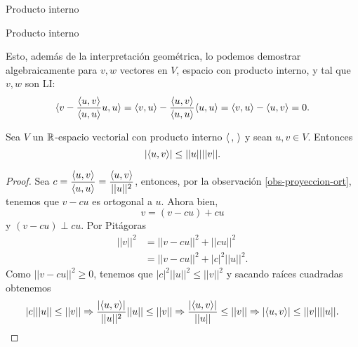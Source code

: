 \begin{chapter}{Producto interno}
\begin{section}{Producto interno}
\begin{observacion}
        
            Esto,  además de la interpretación geométrica, lo podemos demostrar algebraicamente para $v,w$ vectores en $V$, espacio con producto interno, y  tal que $v, w$ son LI:
            \begin{equation*}
            \langle v - \frac{\langle u,v\rangle}{\langle u,u\rangle} u , u \rangle =
            \langle v , u \rangle  -\frac{\langle u,v\rangle}{\langle u,u\rangle}\langle u , u \rangle =  \langle v , u \rangle -  \langle u , v \rangle =0.
            \end{equation*}
            
        \end{observacion}
        
        \begin{proposicion}\label{prop-cauchy-schwarz} Sea $V$  un $\mathbb R$-espacio vectorial con producto interno $\langle \,,\,\rangle$ y sean $u, v\in V$. Entonces 
            $$|\langle u, v \rangle| \le ||u||||v||.$$
        \end{proposicion}
        \begin{proof} 
            Sea $c = \displaystyle\frac{\langle u,v\rangle}{\langle u,u\rangle} = \frac{\langle u,v\rangle}{||u||^2}$, entonces, por la observación \ref{obs-proyeccion-ort}, tenemos que  $ v-cu$ es ortogonal a $u$. Ahora bien, 
            \begin{equation*}
                v = (v - cu) + cu   
            \end{equation*}
            y  $(v - cu) \perp cu$. Por Pitágoras
            \begin{align*}
            ||v||^2 &= ||v-cu||^2 +||cu||^2  \\
            &=||v-cu||^2 +|c|^2||u||^2.
            \end{align*}
            Como $||v-cu||^2 \ge 0$, tenemos que $|c|^2||u||^2 \le 	||v||^2$ y sacando raíces cuadradas obtenemos
            $$
            |c|||u|| \le ||v|| \Rightarrow \frac{|\langle u,v\rangle|}{||u||^2}||u|| \le ||v|| \Rightarrow \frac{|\langle u,v\rangle|}{||u||}\le ||v|| \Rightarrow |\langle u,v\rangle|\le ||v||||u||.
            $$
        \end{proof}
        

\end{section}
\end{chapter}
